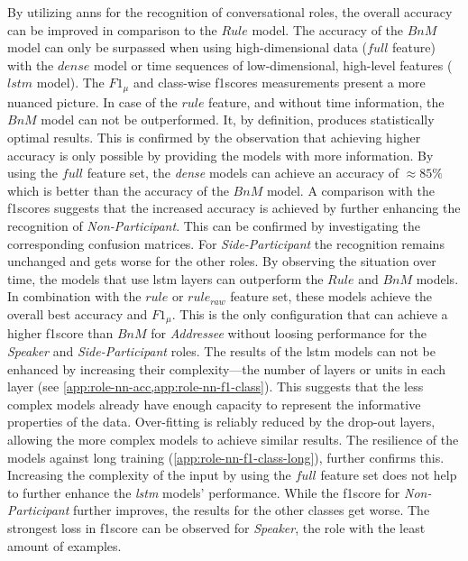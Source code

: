 By utilizing \glspl{ann} for the recognition of \glspl{conversational role}, the overall \gls{accuracy} can be improved in comparison to the \(Rule\) model.
The \gls{accuracy} of the \(BnM\) model can only be surpassed when using high-dimensional data (\(full\) feature) with the \(dense\) model or time sequences of low-dimensional, high-level features (\(lstm\) model).
The \(F1_\mu\) and class-wise \glspl{f1score} measurements present a more nuanced picture.
%
In case of the \(rule\) feature, and without time information, the \(BnM\) model can not be outperformed.
It, by definition, produces statistically optimal results.
This is confirmed by the observation that achieving higher \gls{accuracy} is only possible by providing the models with more information.
By using the \(full\) feature set, the \emph{dense} models can achieve an \gls{accuracy} of \(\approx 85\%\) which is better than the \gls{accuracy} of the \(BnM\) model.
A comparison with the \glspl{f1score} suggests that the increased \gls{accuracy} is achieved by further enhancing the recognition of \emph{Non-Participant}.
This can be confirmed by investigating the corresponding confusion matrices. 
For \emph{Side-Participant} the recognition remains unchanged and gets worse for the other roles.
By observing the situation over time, the models that use \gls{lstm} layers can outperform the \(Rule\) and \(BnM\) models.
In combination with the \(rule\) or \(rule_{raw}\) feature set, these models achieve the overall best \gls{accuracy} and \(F1_\mu\).
This is the only configuration that can achieve a higher \gls{f1score} than \(BnM\) for \emph{Addressee} without loosing performance for the \emph{Speaker} and \emph{Side-Participant} roles.
The results of the \gls{lstm} models can not be enhanced by increasing their complexity---the number of layers or units in each layer (see \cref{app:role-nn-acc,app:role-nn-f1-class}).
This suggests that the less complex models already have enough capacity to represent the informative properties of the data.
Over-fitting is reliably reduced by the drop-out layers, allowing the more complex models to achieve similar results.
The resilience of the models against long training (\cref{app:role-nn-f1-class-long}), further confirms this. 
Increasing the complexity of the input by using the \(full\) feature set does not help to further enhance the \emph{lstm} models' performance.
While the \gls{f1score} for \emph{Non-Participant} further improves, the results for the other classes get worse.
The strongest loss in \gls{f1score} can be observed for \emph{Speaker}, the role with the least amount of examples.  
